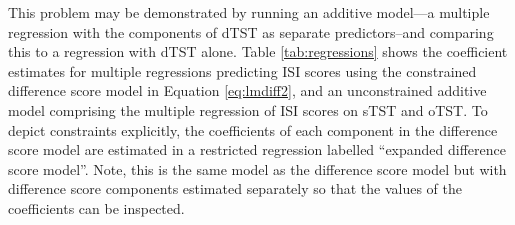 \documentclass[
]{article}
\begin{document}
This problem may be demonstrated by running an additive model---a multiple regression with the components of dTST as separate predictors--and comparing this to a regression with dTST alone. Table \ref{tab:regressions} shows the coefficient estimates for multiple regressions predicting ISI scores using the constrained difference score model in Equation \eqref{eq:lmdiff2}, and an unconstrained additive model comprising the multiple regression of ISI scores on sTST and oTST. To depict constraints explicitly, the coefficients of each component in the difference score model are estimated in a restricted regression labelled ``expanded difference score model''. Note, this is the same model as the difference score model but with difference score components estimated separately so that the values of the coefficients can be inspected.
\end{document}
